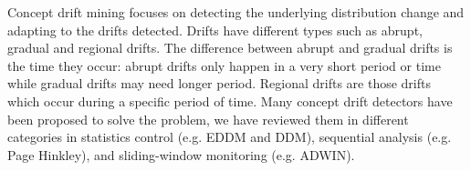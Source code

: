 Concept drift mining focuses on detecting the underlying distribution change and adapting to the drifts detected. Drifts have different types such as abrupt, gradual and regional drifts. The difference between abrupt and gradual drifts is the time they occur: abrupt drifts only happen in a very short period or time while gradual drifts may need longer period. Regional drifts are those drifts which occur during a specific period of time. Many concept drift detectors have been proposed to solve the problem, we have reviewed them in different categories in statistics control (e.g. EDDM and DDM), sequential analysis (e.g. Page Hinkley), and sliding-window monitoring (e.g. ADWIN).



